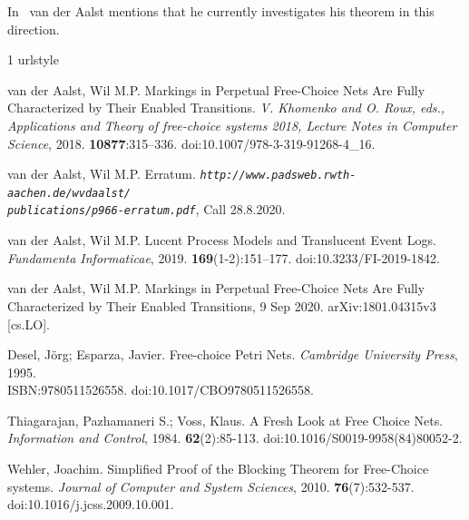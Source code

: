 \documentclass{fundam}
\begin{document}
\mbox{In \cite[Theor. 3, FN 2]{Aal2020}} van der Aalst mentions that he currently investigates his theorem in this direction.


%
\begin{thebibliography}{1}
\providecommand{\url}[1]{\texttt{#1}}
\providecommand{\urlprefix}{URL }
\expandafter\ifx\csname urlstyle\endcsname\relax
  \providecommand{\doi}[1]{doi:\discretionary{}{}{}#1}\else
  \providecommand{\doi}{doi:\discretionary{}{}{}\begingroup
  \urlstyle{rm}\Url}\fi
\providecommand{\eprint}[2][]{\url{#2}}

van der Aalst, Wil M.P.
\newblock Markings in Perpetual Free-Choice Nets Are Fully Characterized by Their Enabled Transitions.
\newblock \emph{V. Khomenko and O. Roux, eds., Applications and Theory of free-choice systems 2018, Lecture Notes in Computer Science}, 2018.
\newblock \textbf{10877}:315--336.    doi:10.1007/978-3-319-91268-4\_16.

van der Aalst, Wil M.P.
\newblock Erratum.
 \emph{\url{http://www.padsweb.rwth-aachen.de/wvdaalst/}\\ \url{publications/p966-erratum.pdf}}, Call 28.8.2020.

van der Aalst, Wil M.P.
\newblock Lucent Process Models and Translucent Event Logs.
\newblock \emph{ Fundamenta Informaticae}, 2019.
\newblock \textbf{169}(1-2):151--177.  doi:10.3233/FI-2019-1842.

van der Aalst, Wil M.P.
\newblock Markings in Perpetual Free-Choice Nets Are Fully Characterized by Their Enabled Transitions,
9 Sep 2020. arXiv:1801.04315v3 [cs.LO].

Desel, J\"org; Esparza, Javier.
\newblock Free-choice Petri Nets.
\newblock \emph{Cambridge University Press}, 1995. \\ ISBN:9780511526558.
doi:10.1017/CBO9780511526558.

Thiagarajan, Pazhamaneri S.; Voss, Klaus.
\newblock A Fresh Look at Free Choice Nets.
\newblock \emph{Information and Control}, 1984.
\newblock \textbf{62}(2):85-113.   doi:10.1016/S0019-9958(84)80052-2.

Wehler, Joachim.
\newblock Simplified Proof of the Blocking Theorem for Free-Choice systems.
\newblock \emph{Journal of Computer and System Sciences}, 2010.
\newblock  \textbf{76}(7):532-537.  doi:10.1016/j.jcss.2009.10.001.
\end{thebibliography}

\end{document}
